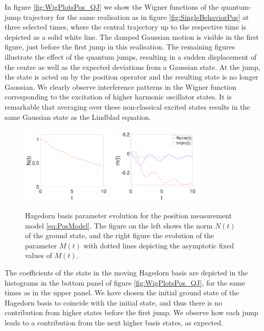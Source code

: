 \documentclass[12pt]{iopart} %
\begin{document}
In figure \ref{fig:WigPlotsPos_QJ} we show the Wigner functions of the quantum-jump trajectory for the same realisation as in figure \ref{fig:SingleBehaviorPos} at three selected times, where the central trajectory up to the respective time is depicted as a solid white line. The damped Gaussian motion is visible in the first figure, just before the first jump in this realisation. The remaining figures illustrate the effect of the quantum jumps, resulting in a sudden displacement of the centre as well as the expected deviations from a Gaussian state. 
At the jump, the state is acted on by the position operator and the resulting state is no longer Gaussian. We clearly observe interference patterns in the Wigner function corresponding to the excitation of higher harmonic oscillator states. It is remarkable that averaging over these non-classical excited states results in the same Gaussian state as the Lindblad equation.
\begin{figure} 
\begin{centering}
	  \includegraphics[width=0.4\textwidth]{ntPos.pdf}
	  \includegraphics[width=0.4\textwidth]{mtPos.pdf}
\caption{Hagedorn basis parameter evolution for the position measurement model \cref{eq:PosModel}. The figure on the left shows the norm $N(t)$ of the ground state, and the right figure the evolution of the parameter $M(t)$ with dotted lines depicting the asymptotic fixed values of $M(t)$.} \label{fig:HagedornVarsPos}
\end{centering}
\end{figure}
The coefficients of the state in the moving Hagedorn basis are depicted in the histograms in the bottom panel of figure \ref{fig:WigPlotsPos_QJ}, for the same times as in the upper panel. We have chosen the initial ground state of the Hagedorn basis to coincide with the initial state, and thus there is no contribution from higher states before the first jump. We observe how each jump leads to a contribution from the next higher basis states, as expected.
\end{document}
